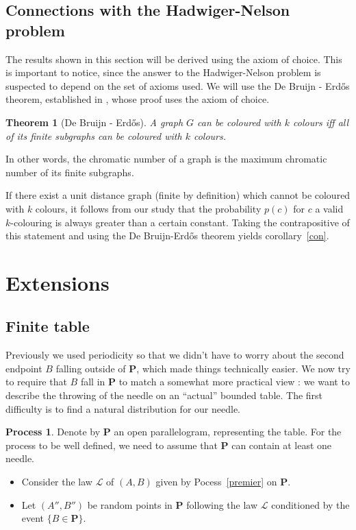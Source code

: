 \documentclass[a4paper,11pt]{article}
\newtheorem{theo}{Theorem}
\theoremstyle{definition}
\newtheorem{process}{Process}
\theoremstyle{remark}
\renewcommand{\P}{\mathbf{P}}
\begin{document}
\subsection{Connections with the Hadwiger-Nelson problem} \label{hn}
The results shown in this section will be derived using the axiom of choice. 
This is important to notice, since the answer to the Hadwiger-Nelson problem is 
suspected to depend on the set of axioms used. We will use the 
De Bruijn - Erd\H{o}s theorem, established in \cite{erdos}, whose proof uses 
the axiom of choice.
\begin{theo}[De Bruijn - Erdős]
 A graph $G$ can be coloured with $k$ colours iff all of its finite subgraphs 
 can be coloured with $k$ colours.
\end{theo}
In other words, the chromatic number of a graph is the maximum chromatic number 
of its finite subgraphs.

If there exist a unit distance graph (finite by definition) which cannot 
be coloured with $k$ colours, it 
follows from our study that the probability $p(c)$ for $c$ a valid 
$k$-colouring is always greater than a certain constant. Taking the 
contrapositive of this statement and using the De Bruijn-Erdős theorem yields 
corollary~\ref{con}.

\section{Extensions}
\label{ext}
\subsection{Finite table}
\label{fini}

Previously we used periodicity so that we didn't have to worry about the second 
endpoint $B$ falling outside of $\mathbf{P}$, which made things technically easier. We now 
try to require that $B$ fall in $\mathbf{P}$ to match a somewhat more practical 
view : we want to describe the throwing of the needle on an ``actual'' bounded 
table. The first difficulty is to find a natural distribution for our needle.

\begin{process} \label{encore}
Denote by $\mathbf{P}$ an open parallelogram, representing the table. For the 
process to be well defined, we need to assume that $\mathbf{P}$ can contain at
least one needle.
\begin{itemize}
\item Consider the law $\mathcal{L}$ of $(A,B)$ given by Pocess~\ref{premier} on $\P$.
\item Let $(A'',B'')$ be random points in $\P$ following the law
$\mathcal{L}$ conditioned by the event $\{B \in \mathbf{P} \}$.
\end{itemize}
\end{process}
\end{document}
